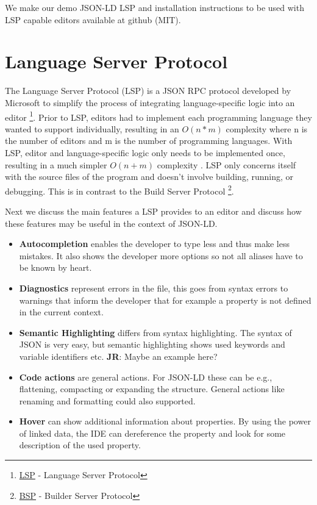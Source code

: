 \documentclass[
]{ceurart}
\newcommand\jr[1]{{\color{Red}\textbf{JR}: #1}}
\begin{document}
We make our demo JSON-LD LSP and installation instructions to be used with LSP capable editors available at github (MIT).


\section{Language Server Protocol}

The Language Server Protocol (LSP) is a JSON RPC protocol developed by Microsoft to simplify the process of integrating language-specific logic into an editor \footnote{\href{https://microsoft.github.io/language-server-protocol/}{LSP} - Language Server Protocol}. 
Prior to LSP, editors had to implement each programming language they wanted to support individually, resulting in an \(O(n*m)\) complexity where n is the number of editors and m is the number of programming languages.
With LSP, editor and language-specific logic only needs to be implemented once, resulting in a much simpler \(O(n+m)\) complexity \cite{LSP-Multi}.
LSP only concerns itself with the source files of the program and doesn't involve building, running, or debugging.
This is in contrast to the Build Server Protocol \footnote{\href{https://github.com/build-server-protocol/build-server-protocol}{BSP} - Builder Server Protocol}.

Next we discuss the main features a LSP provides to an editor and discuss how these features may be useful in the context of JSON-LD.

\begin{itemize}
  \item \textbf{Autocompletion} enables the developer to type less and thus make less mistakes. It also shows the developer more options so not all aliases have to be known by heart.
  \item \textbf{Diagnostics} represent errors in the file, this goes from syntax errors to warnings that inform the developer that for example a property is not defined in the current context.
  \item \textbf{Semantic Highlighting} differs from syntax highlighting. The syntax of JSON is very easy, but semantic highlighting shows used keywords and variable identifiers etc. \jr{Maybe an example here?}
  \item \textbf{Code actions} are general actions. For JSON-LD these can be e.g., flattening, compacting or expanding the structure. General actions like renaming and formatting could also supported.
  \item \textbf{Hover} can show additional information about properties. By using the power of linked data, the IDE can dereference the property and look for some description of the used property.
\end{itemize}
\end{document}
